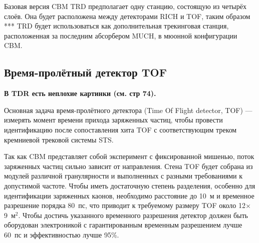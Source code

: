 Базовая версия CBM TRD предполагает одну станцию, состоящую из четырёх слоёв.
Она будет расположена между детекторами RICH и TOF, таким образом ***
TRD будет использоваться как дополнительная трекинговая станция, расположенная за последним абсорбером MUCH, в мюонной конфигурации CBM.



\subsection{Время-пролётный детектор TOF}\label{sec:secTOF}

\textbf{В TDR есть неплохие картинки (см. стр 74).}


Основная задача время-пролётного детектора (Time Of Flight detector, TOF) --- измерять момент времени прихода заряженных частиц, чтобы провести идентификацию после сопоставления хита TOF с соответствующим треком кремниевой трековой системы STS.


Так как CBM представляет собой эксперимент с фиксированной мишенью, поток заряженных частиц сильно зависит от направления. Стена TOF будет собрана из модулей различной гранулярности и выполненных с разными требованиями к допустимой частоте. Чтобы иметь достаточную степень разделения, особенно для идентификации заряженных каонов, необходимо расстояние до 10~м и временное разрешение порядка 80~пс, что приводит к требуемому размеру TOF около 12$\times$9~м$^2$. Чтобы достичь указанного временного разрешения детектор должен быть оборудован электроникой с гарантированным временным разрешением лучше 60~пс и эффективностью лучше 95\%.

